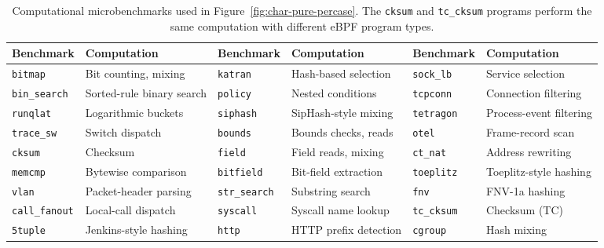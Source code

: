 \begin{table}[t]
\centering
\small
\caption{Computational microbenchmarks used in Figure~\ref{fig:char-pure-percase}. The \texttt{cksum} and \texttt{tc\_cksum} programs perform the same computation with different eBPF program types.}
\label{tab:microbenchmarks}
\renewcommand{\arraystretch}{1.08}
\begin{tabular*}{\textwidth}{@{\extracolsep{\fill}}ll@{\hspace{1.2em}}ll@{\hspace{1.2em}}ll@{}}
\toprule
\textbf{Benchmark} & \textbf{Computation} & \textbf{Benchmark} & \textbf{Computation} & \textbf{Benchmark} & \textbf{Computation} \\
\midrule
\texttt{bitmap} & Bit counting, mixing & \texttt{katran} & Hash-based selection & \texttt{sock\_lb} & Service selection \\
\texttt{bin\_search} & Sorted-rule binary search & \texttt{policy} & Nested conditions & \texttt{tcpconn} & Connection filtering \\
\texttt{runqlat} & Logarithmic buckets & \texttt{siphash} & SipHash-style mixing & \texttt{tetragon} & Process-event filtering \\
\texttt{trace\_sw} & Switch dispatch & \texttt{bounds} & Bounds checks, reads & \texttt{otel} & Frame-record scan \\
\texttt{cksum} & Checksum & \texttt{field} & Field reads, mixing & \texttt{ct\_nat} & Address rewriting \\
\texttt{memcmp} & Bytewise comparison & \texttt{bitfield} & Bit-field extraction & \texttt{toeplitz} & Toeplitz-style hashing \\
\texttt{vlan} & Packet-header parsing & \texttt{str\_search} & Substring search & \texttt{fnv} & FNV-1a hashing \\
\texttt{call\_fanout} & Local-call dispatch & \texttt{syscall} & Syscall name lookup & \texttt{tc\_cksum} & Checksum (TC) \\
\texttt{5tuple} & Jenkins-style hashing & \texttt{http} & HTTP prefix detection & \texttt{cgroup} & Hash mixing \\
\bottomrule
\end{tabular*}
\end{table}
